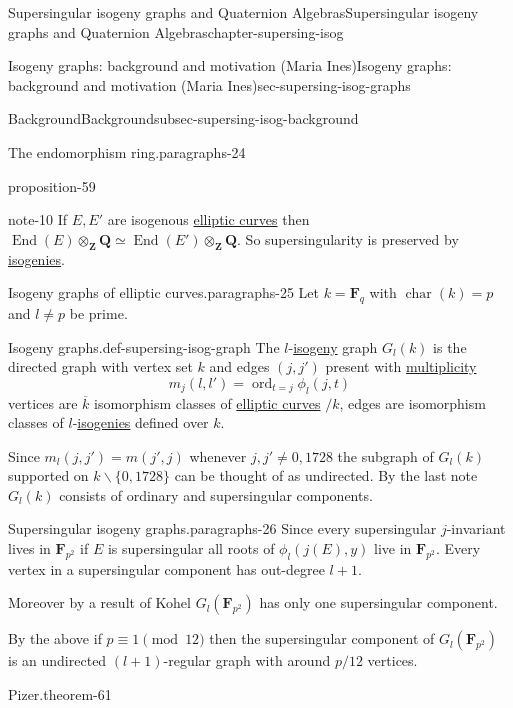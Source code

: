 \documentclass[oneside,10pt,]{book}
\numberwithin{equation}{section}
\newcommand{\ZZ}{\mathbf{Z}}
\newcommand{\QQ}{\mathbf{Q}}
\newcommand{\FF}{\mathbf{F}}
\DeclareMathOperator{\End}{End}
\DeclareMathOperator{\characteristic}{char}
\DeclareMathOperator{\ord}{ord}
\begin{document}
\begin{chapterptx}{Supersingular isogeny graphs and Quaternion Algebras}{}{Supersingular isogeny graphs and Quaternion Algebras}{}{}{chapter-supersing-isog}
\begin{sectionptx}{Isogeny graphs: background and motivation (Maria Ines)}{}{Isogeny graphs: background and motivation (Maria Ines)}{}{}{sec-supersing-isog-graphs}
\begin{subsectionptx}{Background}{}{Background}{}{}{subsec-supersing-isog-background}
\begin{paragraphs}{The endomorphism ring.}{paragraphs-24}
\begin{proposition}{}{}{proposition-59}
\begin{enumerate}
\end{enumerate}
%
\end{proposition}
\begin{note}{}{note-10}%
\hypertarget{p-800}{}%
If \(E,E'\) are isogenous \hyperref[def-supersing-isog-ec]{elliptic curves} then \(\End(E) \otimes_\ZZ \QQ \simeq \End(E')\otimes_\ZZ \QQ\). So supersingularity is preserved by \hyperref[def-supersing-isog-isog]{isogenies}.%
\end{note}
\end{paragraphs}%
\begin{paragraphs}{Isogeny graphs of elliptic curves.}{paragraphs-25}%
\hypertarget{p-801}{}%
Let \(k = \FF_q\) with \(\characteristic(k) = p\) and \(l \ne p \) be prime.%
\begin{definition}{Isogeny graphs.}{def-supersing-isog-graph}%
\hypertarget{p-802}{}%
The \(l\)-\hyperref[def-supersing-isog-isog]{isogeny} graph \(G_l(k)\) is the directed graph with vertex set \(k\) and edges \((j,j')\) present with \hyperref[def-riem-order-vanish]{multiplicity}%
\begin{equation*}
m_j(l,l') = \ord_{t=j} \phi_l(j,t)
\end{equation*}
vertices are \(\overline k\) isomorphism classes of  \hyperref[def-supersing-isog-ec]{elliptic curves} \(/k\), edges are isomorphism classes of \(l\)-\hyperref[def-supersing-isog-isog]{isogenies} defined over \(k\).%
\end{definition}
\hypertarget{p-803}{}%
Since \(m_l(j,j') =  m(j',j)\) whenever \(j,j' \ne  0,1728\) the subgraph of \(G_l(k)\) supported on \(k\smallsetminus \{0,1728\}\) can be thought of as undirected. By the last note \(G_l(k)\) consists of ordinary and supersingular components.%
\end{paragraphs}%
\begin{paragraphs}{Supersingular isogeny graphs.}{paragraphs-26}%
\hypertarget{p-804}{}%
Since every supersingular \(j\)-invariant lives in \(\FF_{p^2}\) if \(E\) is supersingular all roots of \(\phi_l(j(E), y)\) live in \(\FF_{p^2}\). Every vertex in a supersingular component has out-degree \(l+1\).%
\par
\hypertarget{p-805}{}%
Moreover by a result of Kohel \(G_l(\FF_{p^2})\) has only one supersingular component.%
\par
\hypertarget{p-806}{}%
By the above if \(p \equiv 1 \pmod {12}\) then the supersingular component of \(G_l(\FF_{p^2})\) is an undirected \((l+1)\)-regular graph with around \(p/12\) vertices.%
\begin{theorem}{Pizer.}{}{theorem-61}%

\end{theorem}
\end{paragraphs}
\end{subsectionptx}
\end{sectionptx}
\end{chapterptx}
\end{document}
